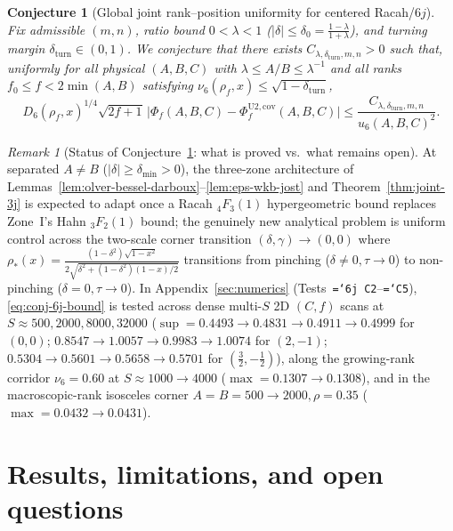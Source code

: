 \documentclass[11pt]{article}
\newtheorem{conjecture}[theorem]{Conjecture}
\theoremstyle{definition}
\theoremstyle{remark}
\newtheorem{remark}[theorem]{Remark}
\renewcommand{\_}{\oldunderscore\penalty0\hskip0pt\relax}
\let\oldtexttt\texttt
\renewcommand{\texttt}[1]{\oldtexttt{\hyphenchar\font=`\-\relax #1}}
\begin{document}
\begin{conjecture}[Global joint rank--position uniformity for centered Racah/$6j$]
\label{conj:joint-6j}
Fix admissible $(m,n)$, ratio bound $0<\lambda<1$ ($|\delta|\le\delta_0=\frac{1-\lambda}{1+\lambda}$), and turning margin
  $\delta_{\mathrm{turn}}\in(0,1)$. We conjecture that there exists $C_{\lambda,\delta_{\mathrm{turn}},m,n}>0$ such that,
  uniformly for all physical $(A,B,C)$ with $\lambda\le A/B\le\lambda^{-1}$ and all ranks
  $f_0\le f<2\min(A,B)$ satisfying $\nu_6(\rho_f,x)\le\sqrt{1-\delta_{\mathrm{turn}}}$,
\begin{equation}
  D_6(\rho_f,x)^{1/4}\sqrt{2f+1}\,\bigl|\Phi_f(A,B,C) - \Phi_f^{\mathrm{U2,cov}}(A,B,C)\bigr| \le \frac{C_{\lambda,\delta_{\mathrm{turn}},m,n}}{u_6(A,B,C)^2}.
  \label{eq:conj-6j-bound}
\end{equation}
\end{conjecture}

\begin{remark}[Status of Conjecture~\ref{conj:joint-6j}: what is proved vs.\ what remains open]
At separated $A\ne B$ ($|\delta|\ge\delta_{\min}>0$), the three-zone architecture of
  Lemmas~\ref{lem:olver-bessel-darboux}--\ref{lem:eps-wkb-jost} and Theorem~\ref{thm:joint-3j} is expected to adapt once a Racah ${}_4F_3(1)$
  hypergeometric bound replaces Zone~I's Hahn ${}_3F_2(1)$ bound; the genuinely new analytical problem is uniform control across
  the two-scale corner transition $(\delta,\gamma)\to(0,0)$ where
  $\rho_*(x)=\frac{(1-\delta^2)\sqrt{1-x^2}}{2\sqrt{\delta^2+(1-\delta^2)(1-x)/2}}$ transitions from pinching ($\delta\ne
  0,\tau\to 0$) to non-pinching ($\delta=0,\tau\to 0$). In Appendix~\ref{sec:numerics}
  (Tests~\texttt{6j~C2}--\texttt{C5}), \eqref{eq:conj-6j-bound} is tested across
  dense multi-$S$ 2D $(C,f)$ scans at $S\approx 500,2000,8000,32000$ ($\sup=0.4493\to 0.4831\to 0.4911\to 0.4999$ for $(0,0)$;
  $0.8547\to 1.0057\to 0.9983\to 1.0074$ for $(2,-1)$; $0.5304\to 0.5601\to 0.5658\to 0.5701$ for $(\frac32,-\frac12)$), along
  the growing-rank corridor $\nu_6=0.60$ at $S\approx 1000\to 4000$ ($\max=0.1307\to 0.1308$), and in the macroscopic-rank
  isosceles corner $A=B=500\to 2000,\rho=0.35$ ($\max=0.0432\to 0.0431$).
\end{remark}

\section{Results, limitations, and open questions}
\label{sec:proved-vs-open}
\end{document}
